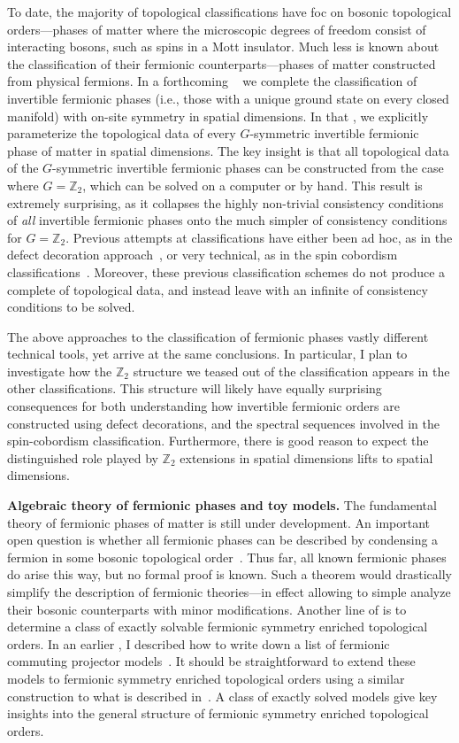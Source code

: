 To date, the majority of topological classifications have foc on bosonic topological orders---phases of matter where the microscopic degrees of freedom consist of interacting bosons, such as spins in a Mott insulator.
Much less is known about the classification of their fermionic counterparts---phases of matter constructed from physical fermions.
In a forthcoming ~\cite{Aasen2020SPT} we complete the classification of invertible fermionic phases (i.e., those with a unique ground state on every closed manifold) with on-site symmetry in  spatial dimensions.
In that , we explicitly parameterize the topological data of every $G$-symmetric invertible fermionic phase of matter in  spatial dimensions.
The key insight is that all topological data of the $G$-symmetric invertible fermionic phases can be constructed from the case where $G =\mathbb{Z}_2$, 
which can be solved on a computer or by hand.
This result is extremely surprising, as it collapses the highly non-trivial consistency conditions of {\em all} invertible fermionic phases onto the much simpler  of consistency conditions for $G = \mathbb{Z}_2$.
Previous attempts at classifications have either been ad hoc, as in the defect decoration approach~\cite{Wang2020}, or very technical, as in the spin cobordism classifications~\cite{Kapustin2014}.
Moreover, these previous classification schemes do not produce a complete  of topological data, and instead leave  with an infinite  of consistency conditions to be solved.

The above  approaches to the classification of fermionic phases  vastly different technical tools, yet arrive at the same conclusions.
In particular, I plan to investigate how the $\mathbb{Z}_2$ structure we teased out of the classification appears in the other  classifications.
This structure will likely have equally surprising consequences for both understanding how invertible fermionic orders are constructed using defect decorations,
and the spectral sequences involved in the spin-cobordism classification.
Furthermore, there is good reason to expect the distinguished role played by $\mathbb{Z}_2$ extensions in  spatial dimensions lifts to  spatial dimensions.

\hfill \break
{\large \textbf{Algebraic theory of fermionic phases and toy models.}}
The fundamental theory of fermionic phases of matter is still under development.
An important open question is whether all fermionic phases can be described by condensing a fermion in some bosonic topological order~\cite{ALM}.
Thus far, all known fermionic phases do arise this way, but no formal proof is known.
Such a theorem would drastically simplify the description of fermionic theories---in effect allowing  to simple analyze their bosonic counterparts with minor modifications.
Another line of  is to determine a class of exactly solvable fermionic symmetry enriched topological orders.
In an earlier , I described how to write down a list of fermionic commuting projector models~\cite{ALM}.
It should be straightforward to extend these models to fermionic symmetry enriched topological orders using a similar construction to what is described in~\cite{Heinrich2016,Cheng2017}.
A class of exactly solved models  give key insights into the general structure of fermionic symmetry enriched topological orders. 

